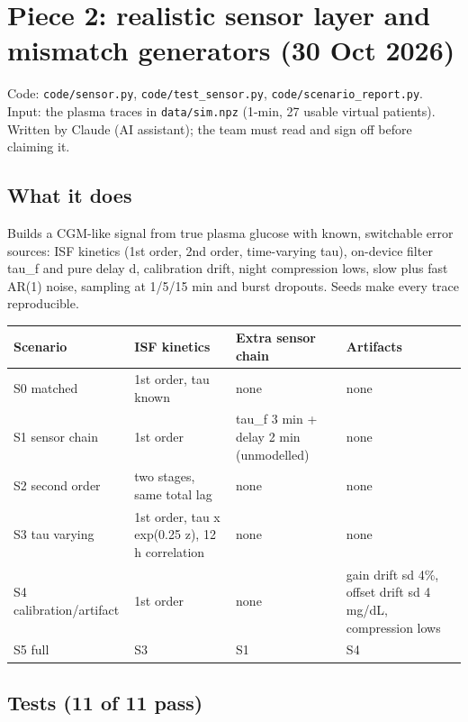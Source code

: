 \documentclass[11pt,a4paper]{article}
\begin{document}
\hypertarget{piece-2-realistic-sensor-layer-and-mismatch-generators-30-oct-2026}{%
\section{Piece 2: realistic sensor layer and mismatch generators (30 Oct
2026)}\label{piece-2-realistic-sensor-layer-and-mismatch-generators-30-oct-2026}}

Code: \texttt{code/sensor.py}, \texttt{code/test\_sensor.py},
\texttt{code/scenario\_report.py}. Input: the plasma traces in
\texttt{data/sim.npz} (1-min, 27 usable virtual patients). Written by
Claude (AI assistant); the team must read and sign off before claiming
it.

\hypertarget{what-it-does}{%
\subsection{What it does}\label{what-it-does}}

Builds a CGM-like signal from true plasma glucose with known, switchable
error sources: ISF kinetics (1st order, 2nd order, time-varying tau),
on-device filter tau\_f and pure delay d, calibration drift, night
compression lows, slow plus fast AR(1) noise, sampling at 1/5/15 min and
burst dropouts. Seeds make every trace reproducible.

\begin{longtable}[]{@{}llll@{}}
\toprule\noalign{}
Scenario & ISF kinetics & Extra sensor chain & Artifacts \\
\midrule\noalign{}
\endhead
\bottomrule\noalign{}
\endlastfoot
S0 matched & 1st order, tau known & none & none \\
S1 sensor chain & 1st order & tau\_f 3 min + delay 2 min (unmodelled) &
none \\
S2 second order & two stages, same total lag & none & none \\
S3 tau varying & 1st order, tau x exp(0.25 z), 12 h correlation & none &
none \\
S4 calibration/artifact & 1st order & none & gain drift sd 4\%, offset
drift sd 4 mg/dL, compression lows \\
S5 full & S3 & S1 & S4 \\
\end{longtable}

\hypertarget{tests-11-of-11-pass}{%
\subsection{Tests (11 of 11 pass)}\label{tests-11-of-11-pass}}
\end{document}
